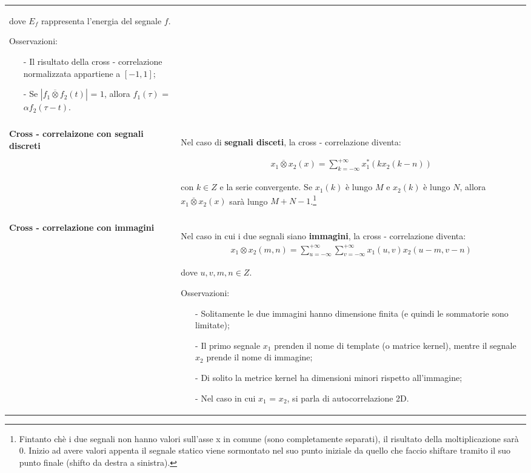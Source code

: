\documentclass[a4paper, 10pt]{report}
\begin{document}
\begin{longtable}{| p{} | p{} |}
\noindent dove $E_f$ rappresenta l'energia del segnale $f$.

\noindent Osservazioni:
\begin{itemize}
\item[-] Il risultato della cross - correlazione normalizzata appartiene a $[-1, 1]$;
\item[-] Se $|f_1 \overline{\otimes} f_2 (t)|$ = $1$, allora $f_1(\tau)$ = $\alpha f_2(\tau - t)$.
\end{itemize}
\\\\
\textbf{Cross - correlaizone con segnali discreti} & Nel caso di \textbf{segnali disceti}, la cross - correlazione diventa:

\begin{align*}
x_1 \overline{\otimes} x_2 (x) =  \sum_{k=-\infty}^{+\infty} x_1^*(kx_2(k - n))
\end{align*}

\noindent con $k \in Z$ e la serie convergente. Se $x_1(k)$ è lungo $M$ e $x_2(k)$ è lungo $N$, allora $x_1 \overline{\otimes} x_2 (x)$ sarà lungo $M+N-1$.\footnote{Fintanto chè i due segnali non hanno valori sull'asse x in comune (sono completamente separati), il risultato della moltiplicazione sarà 0. Inizio ad avere valori appenta il segnale statico viene sormontato nel suo punto iniziale da quello che faccio shiftare tramito il suo punto finale (shifto da destra a sinistra).}\\\\

\textbf{Cross - correlazione con immagini} & Nel caso in cui i due segnali siano \textbf{immagini}, la cross - correlazione diventa:
\begin{align*}
x_1 \otimes x_2 (m, n) =  \sum_{u=-\infty}^{+\infty} \sum_{v=-\infty}^{+\infty} x_1(u, v)x_2(u - m, v - n)
\end{align*}

\noindent dove $u,v,m,n \in Z$.

\noindent Osservazioni:
\begin{itemize}
\item[-] Solitamente le due immagini hanno dimensione finita (e quindi le sommatorie sono limitate);
\item[-] Il primo segnale $x_1$ prenden il nome di template (o matrice kernel), mentre il segnale $x_2$ prende il nome di immagine;
\item[-] Di solito la metrice kernel ha dimensioni minori rispetto all'immagine;
\item[-] Nel caso in cui $x_1$ = $x_2$, si parla di autocorrelazione 2D.
\end{itemize}

\end{longtable}
\end{document}
